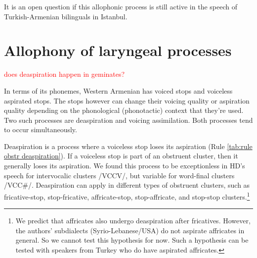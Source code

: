    	
   	It is an open question if this allophonic process is still active in the speech of Turkish-Armenian bilinguals in Istanbul. 
   	
   	\section{Allophony of laryngeal processes}\label{section:segmentalPhono:allphonLaryng}
   	\textcolor{red}{does deaspiration happen in geminates?}
   	
   	
   	In terms of its phonemes, Western Armenian has voiced stops and voiceless aspirated stops. The stops however can change their voicing quality or aspiration quality depending on the phonological (phonotactic) context that they're used. Two such processes are deaspiration and voicing assimilation. Both processes tend to occur simultaneously. 
   	
   	Deaspiration is a process where a voiceless stop loses its aspiration (Rule \ref{tab:rule obstr deaspiration}). If a voiceless stop is part of an obstruent cluster, then it generally loses its aspiration. We found this process to be exceptionless in HD's speech for intervocalic clusters /VCCV/, but variable for word-final clusters /VCC\#/. Deaspiration can apply in different types of obstruent clusters, such as fricative-stop, stop-fricative, affricate-stop, stop-affricate, and stop-stop clusters.\footnote{We predict that affricates also undergo deaspiration after fricatives. However, the authors' subdialects (Syrio-Lebanese/USA) do not aspirate affricates in general. So we cannot test this hypothesis for now. Such a hypothesis can be tested with speakers from Turkey who do have aspirated affricates. 
   	}
   	
